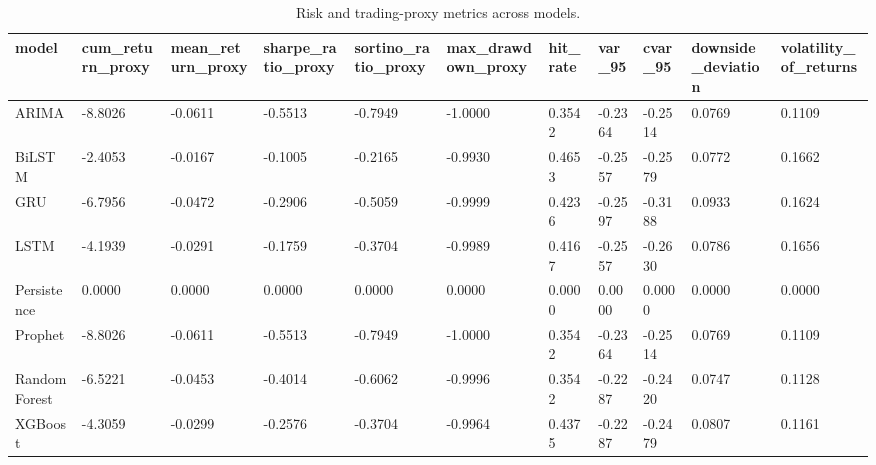 \begin{table}[htbp]
\centering
\begin{tabular}{lllllllllll}
\hline
model & cum_return_proxy & mean_return_proxy & sharpe_ratio_proxy & sortino_ratio_proxy & max_drawdown_proxy & hit_rate & var_95 & cvar_95 & downside_deviation & volatility_of_returns \\
\hline
ARIMA & -8.8026 & -0.0611 & -0.5513 & -0.7949 & -1.0000 & 0.3542 & -0.2364 & -0.2514 & 0.0769 & 0.1109 \\
BiLSTM & -2.4053 & -0.0167 & -0.1005 & -0.2165 & -0.9930 & 0.4653 & -0.2557 & -0.2579 & 0.0772 & 0.1662 \\
GRU & -6.7956 & -0.0472 & -0.2906 & -0.5059 & -0.9999 & 0.4236 & -0.2597 & -0.3188 & 0.0933 & 0.1624 \\
LSTM & -4.1939 & -0.0291 & -0.1759 & -0.3704 & -0.9989 & 0.4167 & -0.2557 & -0.2630 & 0.0786 & 0.1656 \\
Persistence & 0.0000 & 0.0000 & 0.0000 & 0.0000 & 0.0000 & 0.0000 & 0.0000 & 0.0000 & 0.0000 & 0.0000 \\
Prophet & -8.8026 & -0.0611 & -0.5513 & -0.7949 & -1.0000 & 0.3542 & -0.2364 & -0.2514 & 0.0769 & 0.1109 \\
Random Forest & -6.5221 & -0.0453 & -0.4014 & -0.6062 & -0.9996 & 0.3542 & -0.2287 & -0.2420 & 0.0747 & 0.1128 \\
XGBoost & -4.3059 & -0.0299 & -0.2576 & -0.3704 & -0.9964 & 0.4375 & -0.2287 & -0.2479 & 0.0807 & 0.1161 \\
\hline
\end{tabular}
\caption{Risk and trading-proxy metrics across models.}
\label{table_risk_adjusted_evaluation}
\end{table}